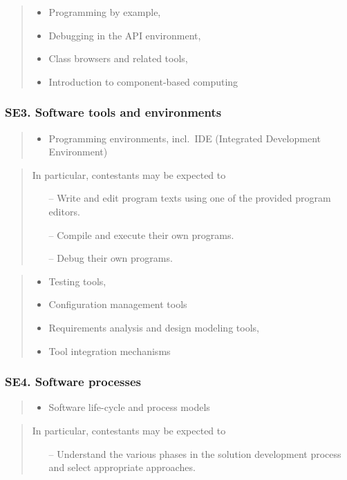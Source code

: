 \documentclass[a4paper,11pt,oneside]{article}
\newcommand{\cmark}{\ding{51}}%
\newcommand{\xmark}{\ding{55}}%
\newcommand{\CC}[1]{#1}
\newcommand{\Ccodeonly}{{\small\cmark\faFileText}}
\newcommand{\Cexcluded}{{\small\xmark}}
\newcommand{\Icodeonly}{\item[\hbox to 1.8em{\Ccodeonly\hfill}]}
\newcommand{\Iexcluded}{\item[\hbox to 1.8em{\Cexcluded\hfill}]}
\newenvironment{myitemize}{\begin{quote}\begin{itemize}\itemsep 0pt}{\end{itemize}\end{quote}}
\begin{document}
        \begin{myitemize}
        \Iexcluded \CC{Programming by example},
        \Iexcluded \CC{Debugging in the API environment},
        \Iexcluded \CC{Class browsers and related tools},
        \Iexcluded \CC{Introduction to component-based computing}
        \end{myitemize}

    \subsubsection*{SE3. Software tools and environments}

        \begin{myitemize}
        \Icodeonly\CC{Programming environments}, incl.\ IDE (Integrated Development Environment)
        \end{myitemize}

        \begin{quote}
        In particular, contestants may be expected to
        \begin{itemize}
        \itemsep -3pt
        \item[--] Write and edit program texts using one of the provided program editors.
        \item[--] Compile and execute their own programs.
        \item[--] Debug their own programs.
        \end{itemize}
        \end{quote}

        \begin{myitemize}
        \Iexcluded \CC{Testing tools},
        \Iexcluded \CC{Configuration management tools}
        \Iexcluded \CC{Requirements analysis and design modeling tools},
        \Iexcluded \CC{Tool integration mechanisms}
        \end{myitemize}

    \subsubsection*{SE4. Software processes}

        \begin{myitemize}
        \Icodeonly\CC{Software life-cycle and process models}
        \end{myitemize}

        \begin{quote}
        In particular, contestants may be expected to
        \begin{itemize}
        \itemsep -3pt
        \item[--] Understand the various phases in the solution development process and select appropriate approaches.
        \end{itemize}
        \end{quote}
\end{document}
